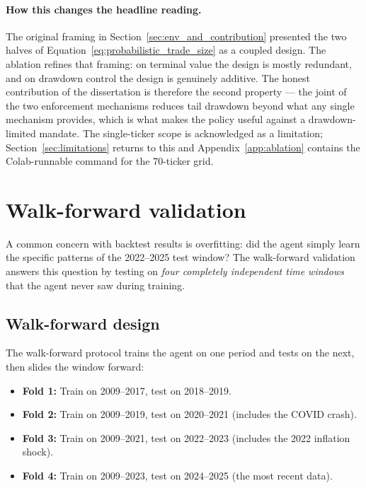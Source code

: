 \paragraph{How this changes the headline reading.} The original framing in Section~\ref{sec:env_and_contribution} presented the two halves of Equation~\ref{eq:probabilistic_trade_size} as a coupled design. The ablation refines that framing: on terminal value the design is mostly redundant, and on drawdown control the design is genuinely additive. The honest contribution of the dissertation is therefore the second property --- the joint of the two enforcement mechanisms reduces tail drawdown beyond what any single mechanism provides, which is what makes the policy useful against a drawdown-limited mandate. The single-ticker scope is acknowledged as a limitation; Section~\ref{sec:limitations} returns to this and Appendix~\ref{app:ablation} contains the Colab-runnable command for the 70-ticker grid.

\section{Walk-forward validation}
\label{sec:walk_forward}

A common concern with backtest results is overfitting: did the agent simply learn the specific patterns of the 2022--2025 test window? The walk-forward validation answers this question by testing on \emph{four completely independent time windows} that the agent never saw during training.

\subsection{Walk-forward design}

The walk-forward protocol trains the agent on one period and tests on the next, then slides the window forward:

\begin{itemize}[leftmargin=*]
  \item \textbf{Fold 1:} Train on 2009--2017, test on 2018--2019.
  \item \textbf{Fold 2:} Train on 2009--2019, test on 2020--2021 (includes the COVID crash).
  \item \textbf{Fold 3:} Train on 2009--2021, test on 2022--2023 (includes the 2022 inflation shock).
  \item \textbf{Fold 4:} Train on 2009--2023, test on 2024--2025 (the most recent data).
\end{itemize}

